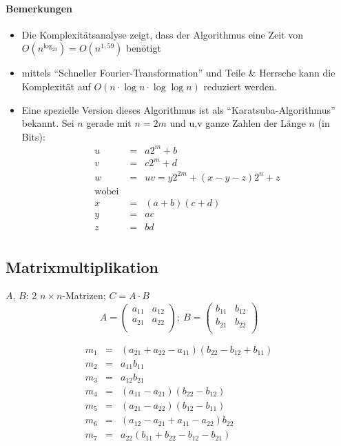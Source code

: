 \documentclass[a4paper]{scrartcl}
\begin{document}
\paragraph{Bemerkungen}
\begin{itemize}
	\item Die Komplexitätsanalyse zeigt, dass der Algorithmus eine Zeit von $O(n^{\log_23})=O(n^{1,59})$ benötigt
	\item mittels "`Schneller Fourier-Transformation"' und Teile \& Herrsche kann die Komplexität auf 
				$O(n \cdot \log n \cdot \log \log n)$ reduziert werden.
	\item Eine spezielle Version dieses Algorithmus ist als "`Karatsuba-Algorithmus"' bekannt.
				Sei $n$ gerade mit $n=2m$ und u,v ganze Zahlen der Länge $n$ (in Bits):
				\begin{eqnarray*}
					u   & = & a2^m+b \\
					v   & = & c2^m+d \\
					w   & = & uv = y2^{2m}+(x-y-z)2^n+z \\
					\text{wobei } & & \\
					x & = & (a+b)(c+d) \\
					y & = & ac \\
					z & = & bd \\
				\end{eqnarray*}
\end{itemize}

\subsection{Matrixmultiplikation}
$A$, $B$: 2 $n \times n$-Matrizen; $C = A \cdot B$
$$A=\left(\begin{array}{ll}
	a_{11} & a_{12} \\
	a_{21} & a_{22} \\
\end{array}\right);\ B=
\left(\begin{array}{ll}
	b_{11} & b_{12} \\
	b_{21} & b_{22} \\
\end{array}\right)$$

\begin{eqnarray*}
	m_1 & = & (a_{21} + a_{22} - a_{11})(b_{22}-b_{12}+b_{11}) \\
	m_2 & = & a_{11}b_{11} \\
	m_3 & = & a_{12}b_{21} \\
	m_4 & = & (a_{11}-a_{21})(b_{22}-b_{12}) \\
	m_5 & = & (a_{21}-a_{22})(b_{12}-b_{11}) \\
	m_6 & = & (a_{12}-a_{21}+a_{11}-a_{22})b_{22} \\
	m_7 & = & a_{22}(b_{11}+b_{22}-b_{12}-b_{21}) \\
\end{eqnarray*}
\end{document}
